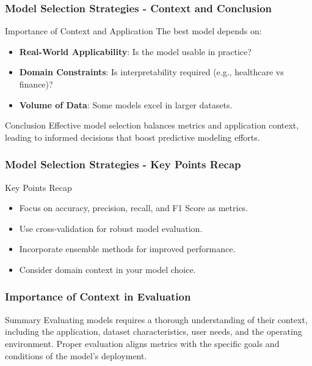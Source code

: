 \documentclass[aspectratio=169]{beamer}
\begin{document}
\begin{frame}[fragile]
    \frametitle{Model Selection Strategies - Context and Conclusion}
    \begin{block}{Importance of Context and Application}
        The best model depends on:
        \begin{itemize}
            \item \textbf{Real-World Applicability}: Is the model usable in practice?
            \item \textbf{Domain Constraints}: Is interpretability required (e.g., healthcare vs finance)?
            \item \textbf{Volume of Data}: Some models excel in larger datasets.
        \end{itemize}
    \end{block}

    \begin{block}{Conclusion}
        Effective model selection balances metrics and application context, leading to informed decisions that boost predictive modeling efforts.
    \end{block}
\end{frame}

\begin{frame}[fragile]
    \frametitle{Model Selection Strategies - Key Points Recap}
    \begin{block}{Key Points Recap}
        \begin{itemize}
            \item Focus on accuracy, precision, recall, and F1 Score as metrics.
            \item Use cross-validation for robust model evaluation.
            \item Incorporate ensemble methods for improved performance.
            \item Consider domain context in your model choice.
        \end{itemize}
    \end{block}
\end{frame}

\begin{frame}[fragile]
    \frametitle{Importance of Context in Evaluation}
    \begin{block}{Summary}
        Evaluating models requires a thorough understanding of their context, including the application, dataset characteristics, user needs, and the operating environment. Proper evaluation aligns metrics with the specific goals and conditions of the model's deployment.
    \end{block}
\end{frame}
\end{document}
